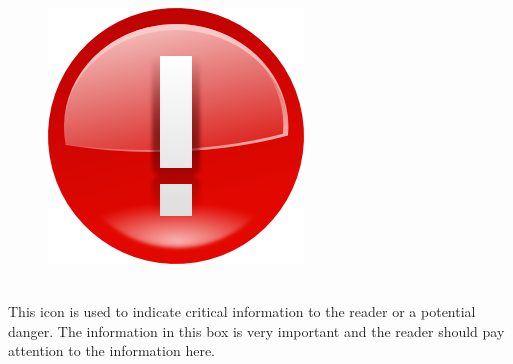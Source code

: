 \documentclass[nohyper,nobib]{tufte-book}
\begin{document}
\begin{framed}
\begin{figure}
\includegraphics[width=\linewidth]{images/important_icon.png}
\end{figure}
\ \\
This icon is used to indicate critical information to the reader or a potential danger.  The information in this box is very important and the reader should pay attention to the information here.
\ \\
\end{framed}
\end{document}
